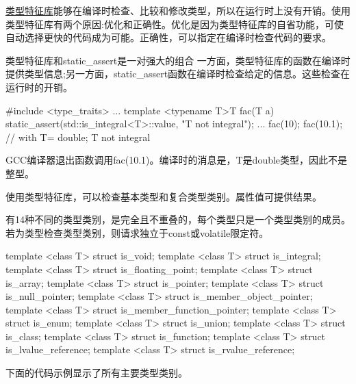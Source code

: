 \href{http://en.cppreference.com/w/cpp/header/type_traits}{类型特征库}能够在编译时检查、比较和修改类型，所以在运行时上没有开销。使用类型特征库有两个原因:优化和正确性。优化是因为类型特征库的自省功能，可使自动选择更快的代码成为可能。正确性，可以指定在编译时检查代码的要求。

\begin{myTip}{类型特征库和static\_assert是一对强大的组合}
一方面，类型特征库的函数在编译时提供类型信息;另一方面，static\_assert函数在编译时检查给定的信息。这些检查在运行时的开销。

\begin{cpp}
#include <type_traits>
...
template <typename T>T fac(T a){
	static_assert(std::is_integral<T>::value, "T not integral");
	...
}
fac(10);
fac(10.1); // with T= double; T not integral
\end{cpp}

GCC编译器退出函数调用fac(10.1)。编译时的消息是，T是double类型，因此不是整型。
	
\end{myTip}


使用类型特征库，可以检查基本类型和复合类型类别。属性值可提供结果。


有14种不同的类型类别，是完全且不重叠的，每个类型只是一个类型类别的成员。若为类型检查类型类别，则请求独立于const或volatile限定符。

\begin{cpp}
template <class T> struct is_void;
template <class T> struct is_integral;
template <class T> struct is_floating_point;
template <class T> struct is_array;
template <class T> struct is_pointer;
template <class T> struct is_null_pointer;
template <class T> struct is_member_object_pointer;
template <class T> struct is_member_function_pointer;
template <class T> struct is_enum;
template <class T> struct is_union;
template <class T> struct is_class;
template <class T> struct is_function;
template <class T> struct is_lvalue_reference;
template <class T> struct is_rvalue_reference;
\end{cpp}

下面的代码示例显示了所有主要类型类别。



